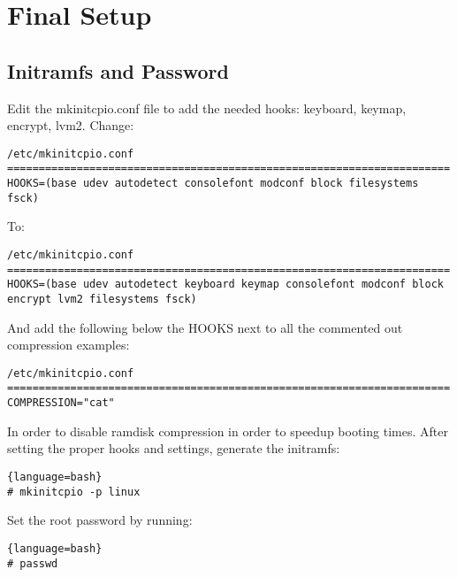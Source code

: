\section{Final Setup}
\subsection{Initramfs and Password}
Edit the mkinitcpio.conf file to add the needed hooks: keyboard, keymap, encrypt, lvm2. Change:
\begin{verbatim}
/etc/mkinitcpio.conf
======================================================================
HOOKS=(base udev autodetect consolefont modconf block filesystems fsck)
\end{verbatim}
To:
\begin{verbatim}
/etc/mkinitcpio.conf
======================================================================
HOOKS=(base udev autodetect keyboard keymap consolefont modconf block encrypt lvm2 filesystems fsck)
\end{verbatim}
And add the following below the HOOKS next to all the commented out compression examples:
\begin{verbatim}
/etc/mkinitcpio.conf
======================================================================
COMPRESSION="cat"
\end{verbatim}
In order to disable ramdisk compression in order to speedup booting times.
After setting the proper hooks and settings, generate the initramfs:
\begin{lstlisting}{language=bash}
# mkinitcpio -p linux
\end{lstlisting}
Set the root password by running:
\begin{lstlisting}{language=bash}
# passwd
\end{lstlisting}

